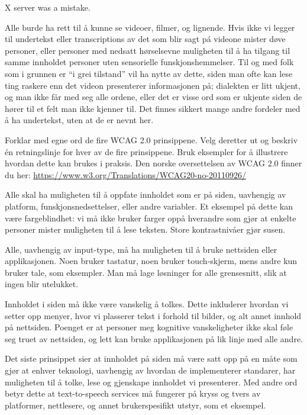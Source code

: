 \documentclass{../../myassignment}
\begin{document}
\begin{answer}
\begin{description}[style=nextline]
				X server was a mistake. 

			\item [Tekst video]
				Alle burde ha rett til å kunne se videoer, filmer, og lignende. Hvis ikke vi legger til undertekst eller transcriptions av det som blir sagt pá videone mister døve personer, eller personer med nedsatt hørselsevne muligheten til å ha tilgang til samme innholdet personer uten sensorielle funskjonshemmelser. Til og med folk som i grunnen er ``i grei tilstand'' vil ha nytte av dette, siden man ofte kan lese ting raskere enn det videon presenterer informasjonen på; dialekten er litt ukjent, og man ikke får med seg alle ordene, eller det er visse ord som er ukjente siden de hører til et felt man ikke kjenner til. Det finnes sikkert mange andre fordeler med å ha undertekst, uten at de er nevnt her.

		\end{description}
	\end{answer}


	\begin{problem}
		Forklar med egne ord de fire WCAG 2.0 prinsippene. Velg deretter ut og beskriv én retningslinje for hver av de fire prinsippene. Bruk eksempler for å illustrere hvordan dette kan brukes i praksis. Den norske oversettelsen av WCAG 2.0 finner du her: \url{https://www.w3.org/Translations/WCAG20-no-20110926/}
	\end{problem}
	\begin{answer}
		\begin{description}[style=nextline]
			\item [Persepsjon] Alle skal ha muligheten til å oppfate innholdet som er på siden, uavhengig av platform, funskjonsnedsettelser, eller andre variabler. Et eksempel på dette kan være fargeblindhet: vi må ikke bruker farger oppå hverandre som gjør at enkelte personer mister muligheten til å lese teksten. Store kontrastnivåer gjør susen.
			\item [Operasjon] Alle, uavhengig av input-type, må ha muligheten til å bruke nettsiden eller applikasjonen. Noen bruker tastatur, noen bruker touch-skjerm, mens andre kun bruker tale, som eksempler. Man må lage løsninger for alle grensesnitt, slik at ingen blir utelukket. 
			\item [Forståelig] Innholdet i siden må ikke være vanskelig å tolkes. Dette inkluderer hvordan vi setter opp menyer, hvor vi plasserer tekst i forhold til bilder, og alt annet innhold på nettsiden. Poenget er at personer meg kognitive vanskeligheter ikke skal føle seg truet av nettsiden, og lett kan bruke applikasjonen på lik linje med alle andre. 
			\item [Robust] Det siste prinsippet sier at innholdet på siden må være satt opp på en måte som gjør at enhver teknologi, uavhengig av hvordan de implementerer standarer, har muligheten til å tolke, lese og gjenskape innholdet vi presenterer. Med andre ord betyr dette at text-to-speech services må fungerer på kryss og tvers av platformer, nettlesere, og annet brukerspesifikt utstyr, som et eksempel. 
		\end{description}
	\end{answer}
\end{document}
